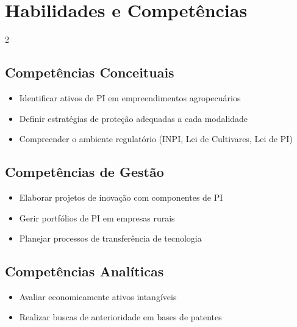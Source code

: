 \documentclass[11pt,a4paper]{article}
\begin{document}
\section*{Habilidades e Competências}

\begin{multicols}{2}

\subsection*{Competências Conceituais}

\begin{itemize}

\item Identificar ativos de PI em empreendimentos agropecuários

\item Definir estratégias de proteção adequadas a cada modalidade

\item Compreender o ambiente regulatório (INPI, Lei de Cultivares, Lei de PI)

\end{itemize}

\subsection*{Competências de Gestão}

\begin{itemize}

\item Elaborar projetos de inovação com componentes de PI

\item Gerir portfólios de PI em empresas rurais

\item Planejar processos de transferência de tecnologia

\end{itemize}

\columnbreak

\subsection*{Competências Analíticas}

\begin{itemize}

\item Avaliar economicamente ativos intangíveis

\item Realizar buscas de anterioridade em bases de patentes


\end{itemize}
\end{multicols}
\end{document}
